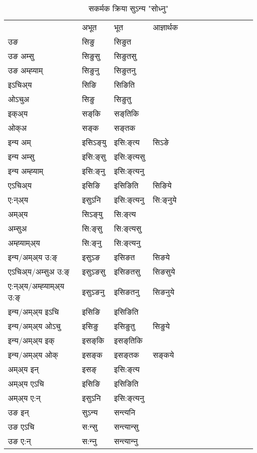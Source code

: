 \begin{table}[H]
\label{iŋ.vt} \centering
\caption{सकर्मक क्रिया  सुऽन्य  "सोध्नु"  }
\begin{tabular}{l|l|l|l|l|l|l|l|l|l|l|l|l}  \toprule
&अभूत & भूत & आज्ञार्थक \\ 
उङ &सिङु &सिङुत \\ 
उङ अम्सु &सिङुसु &सिङुतसु \\ 
उङ अम्ह्‍याम् &सिङुनु &सिङुतनु \\ 
इऽचिअ्य &सिङि &सिङिति   \\ 
ओऽचुअ &सिङु &सिङुतु   \\ 
इक्अ्य &सङ्‌कि &सङ्‌तिकि   \\ 
ओक्अ &सङ्‌क &सङ्‌तक   \\ 
इन्य अम् & इसिऽङ्‌यु  & इसि:ङ्‌त्य &सिऽङे  \\ 
इन्य अम्सु & इसि:ङ्‌सु  & इसि:ङ्‌त्यसु   \\ 
इन्य अम्ह्‍याम् & इसि:ङ्‌नु  & इसि:ङ्‌त्यनु   \\ 
एऽचिअ्य & इसिङि & इसिङिति &सिङिये    \\ 
ए:न्अ्य & इसुऽनि  & इसि:ङ्‌त्यनु &सि:ङ्‌नुये  \\ 
अम्अ्य & सिऽङ्‌यु  & सि:ङ्‌त्य  \\ 
अम्सुअ & सि:ङ्‌सु & सि:ङ्‌त्यसु  \\ 
अम्ह्‍याम्अ्य & सि:ङ्‌नु  & सि:ङ्‌त्यनु \\ 
\midrule
इन्य/अम्अ्य उ:ङ्‌&इसुऽङ & इसिङत &सिङये \\ 
एऽचिअ्य/अम्सुअ उ:ङ्‌ &इसुऽङसु & इसिङतसु &सिङसुये \\ 
ए:न्अ्य/अम्ह्‍याम्अ्य उ:ङ्‌ &इसुऽङनु & इसिङतनु &सिङनुये \\ 
इन्य/अम्अ्य इऽचि & इसिङि & इसिङिति    \\ 
इन्य/अम्अ्य ओऽचु & इसिङु & इसिङुतु  &सिङुये  \\ 
इन्य/अम्अ्य इक् & इसङ्‌कि & इसङ्‌तिकि   \\ 
इन्य/अम्अ्य ओक् & इसङ्‌क & इसङ्‌तक  &सङ्‌कये  \\ 
अम्अ्य इन् & इसङ्‌ & इसि:ङ्‌त्य   \\ 
अम्अ्य एऽचि & इसिङि & इसिङिति    \\ 
अम्अ्य ए:न् & इसुऽनि  & इसि:ङ्‌त्यनु  \\ 
\midrule
उङ इन् & सुऽन्य  & सन्त्यनि  \\ 
उङ एऽचि & स:न्सु  & सन्त्यान्सु   \\ 
उङ ए:न्& स:न्‍नु  & सन्त्यान्‍नु   \\ 
\bottomrule
\end{tabular}
\end{table}


